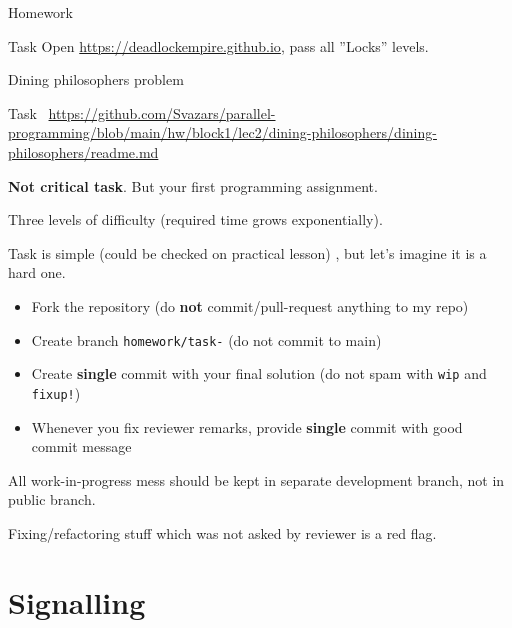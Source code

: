 \begin{frame}{Homework}
\begin{homeworkmail}{Task \taskEmpire}{
    Open \url{https://deadlockempire.github.io}, pass all ''Locks'' levels.
}
\end{homeworkmail}
\end{frame}


\begin{frame}{Dining philosophers problem}

\begin{homeworkcode}{Task~\taskCodeDining}
\url{https://github.com/Svazars/parallel-programming/blob/main/hw/block1/lec2/dining-philosophers/dining-philosophers/readme.md}
\end{homeworkcode}

\textbf{Not critical task}. \pause But your first programming assignment.

\pause
Three levels of difficulty (required time grows exponentially).

\pause
Task is simple (could be checked on practical lesson) \pause, but let's imagine it is a hard one.

\pause
\begin{itemize}
    \item Fork the repository (do \textbf{not} commit/pull-request anything to my repo)
    \item Create branch \texttt{homework/task-\taskCodeDining} (do not commit to main)
    \item Create \textbf{single} commit with your final solution (do not spam with \texttt{wip} and \texttt{fixup!})
    \item Whenever you fix reviewer remarks, provide \textbf{single} commit with good commit message
\end{itemize}

All work-in-progress mess should be kept in separate development branch, not in public branch.

Fixing/refactoring stuff which was not asked by reviewer is a red flag.

\end{frame}

\section{Signalling}
\showTOC

